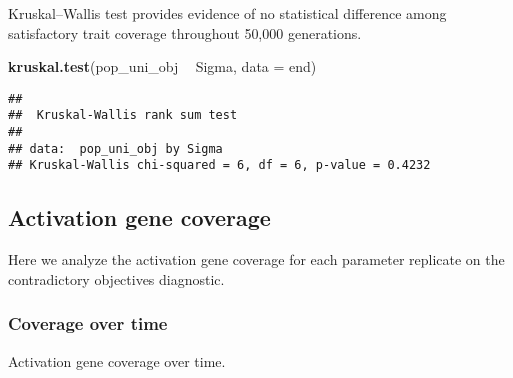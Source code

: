 \documentclass[]{book}
\newenvironment{Shaded}{\begin{snugshade}}{\end{snugshade}}
\newcommand{\DataTypeTok}[1]{\textcolor[rgb]{0.13,0.29,0.53}{#1}}
\newcommand{\KeywordTok}[1]{\textcolor[rgb]{0.13,0.29,0.53}{\textbf{#1}}}
\newcommand{\NormalTok}[1]{#1}
\newcommand{\OperatorTok}[1]{\textcolor[rgb]{0.81,0.36,0.00}{\textbf{#1}}}
\newcommand{\StringTok}[1]{\textcolor[rgb]{0.31,0.60,0.02}{#1}}
\begin{document}
Kruskal--Wallis test provides evidence of no statistical difference among satisfactory trait coverage throughout 50,000 generations.

\begin{Shaded}
\begin{Highlighting}[]
\KeywordTok{kruskal.test}\NormalTok{(pop_uni_obj }\OperatorTok{~}\StringTok{ }\NormalTok{Sigma, }\DataTypeTok{data =}\NormalTok{ end)}
\end{Highlighting}
\end{Shaded}

\begin{verbatim}
## 
##  Kruskal-Wallis rank sum test
## 
## data:  pop_uni_obj by Sigma
## Kruskal-Wallis chi-squared = 6, df = 6, p-value = 0.4232
\end{verbatim}

\hypertarget{activation-gene-coverage-6}{%
\subsection{Activation gene coverage}\label{activation-gene-coverage-6}}

Here we analyze the activation gene coverage for each parameter replicate on the contradictory objectives diagnostic.

\hypertarget{coverage-over-time-9}{%
\subsubsection{Coverage over time}\label{coverage-over-time-9}}

Activation gene coverage over time.

\begin{Shaded}
\end{Shaded}
\end{document}
